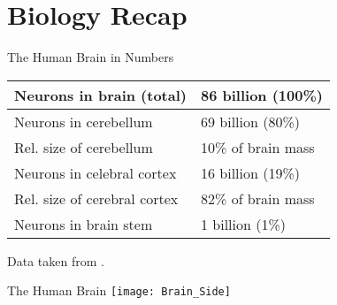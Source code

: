 \section{Biology Recap}



\begin{frame}[c]{The Human Brain in Numbers}
    \pause
    \begin{tabular}{ll}
        Neurons in brain (total) & 86 billion (100\%) \\ \hline \pause
        Neurons in cerebellum & 69 billion (80\%) \\ \pause
        Rel. size of cerebellum & 10\% of brain mass\\ \hline \pause
        Neurons in celebral cortex & 16 billion (19\%) \\ \pause
        Rel. size of cerebral cortex & 82\% of brain mass \\ \hline \pause
        Neurons in brain stem & 1 billion (1\%) \\
    \end{tabular}
    \newline
    \newline
    \newline
    Data taken from \cite{herculano2009human}.
\end{frame}


\begin{frame}[c]{The Human Brain}
    \texttt{[image: Brain\_Side]}
\end{frame}





